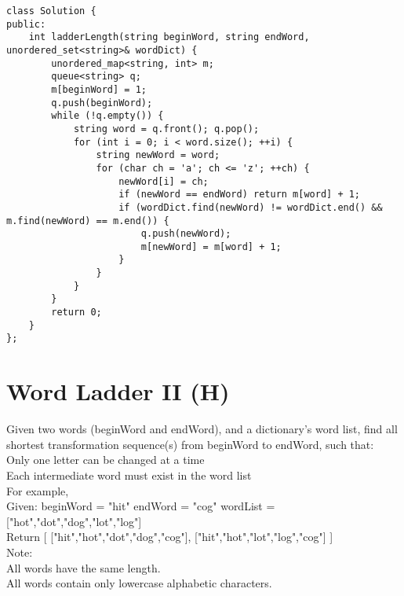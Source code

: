 \begin{lstlisting}
class Solution {
public:
    int ladderLength(string beginWord, string endWord, unordered_set<string>& wordDict) {
        unordered_map<string, int> m;
        queue<string> q;
        m[beginWord] = 1;
        q.push(beginWord);
        while (!q.empty()) {
            string word = q.front(); q.pop();
            for (int i = 0; i < word.size(); ++i) {
                string newWord = word;
                for (char ch = 'a'; ch <= 'z'; ++ch) {
                    newWord[i] = ch;
                    if (newWord == endWord) return m[word] + 1;
                    if (wordDict.find(newWord) != wordDict.end() && m.find(newWord) == m.end()) {
                        q.push(newWord);
                        m[newWord] = m[word] + 1;
                    }   
                }
            }
        }
        return 0;
    }
};
\end{lstlisting}


\section{Word Ladder II (H)}
Given two words (beginWord and endWord), and a dictionary's word list, find all shortest transformation sequence(s) from beginWord to endWord, such that:\\
    Only one letter can be changed at a time\\
    Each intermediate word must exist in the word list\\

For example,\\
Given:
beginWord = "hit"
endWord = "cog"
wordList = ["hot","dot","dog","lot","log"]\\

Return
  [
    ["hit","hot","dot","dog","cog"],
    ["hit","hot","lot","log","cog"]
  ]\\

Note:\\
    All words have the same length.\\
    All words contain only lowercase alphabetic characters.\\

